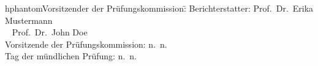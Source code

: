 
\vspace*{\fill}
\begin{tabbing}
hphantom{Vorsitzender der Prüfungskommission:}\=\kill
Berichterstatter: \>  Prof.\ Dr.\ Erika Mustermann \\ 
~	\> Prof.\ Dr.\ John Doe \\%
Vorsitzende der Prüfungskommission:	\> n.\ n.\\  
Tag der mündlichen Prüfung:	\> n.\ n.
\end{tabbing} 

